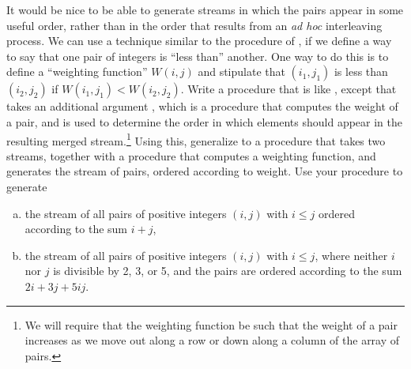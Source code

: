 \begin{exerciseGroup}
\label{Exercise 3.70}
 It would be nice to be able to
generate streams in which the pairs appear in some useful order, rather than in
the order that results from an \emph{ad hoc} interleaving process.  We can use
a technique similar to the  procedure of , if we
define a way to say that one pair of integers is ``less than'' another.  One
way to do this is to define a ``weighting function'' \( W(i, j) \) and
stipulate that \( (i_1, j_1) \) is less than \( (i_2, j_2) \) if
\( W(i_1, j_1) < W(i_2, j_2) \).  Write a procedure
 that is like , except that
 takes an additional argument , which is a
procedure that computes the weight of a pair, and is used to determine the
order in which elements should appear in the resulting merged
stream.\footnote{We will require that the weighting function be such that the
weight of a pair increases as we move out along a row or down along a column of
the array of pairs.}  Using this, generalize  to a procedure
 that takes two streams, together with a procedure that
computes a weighting function, and generates the stream of pairs, ordered
according to weight.  Use your procedure to generate

\begin{enumerate}[a.]

\item
the stream of all pairs of positive integers \( (i, j) \) with \( i \le j \)
ordered according to the sum \( i + j \),

\item
the stream of all pairs of positive integers \( (i, j) \) with \( i \le j \),
where neither \( i \) nor \( j \) is divisible by 2, 3, or 5, and the pairs are
ordered according to the sum \( 2i + 3\!j + 5i\!j \).

\end{enumerate}


\end{exerciseGroup}
